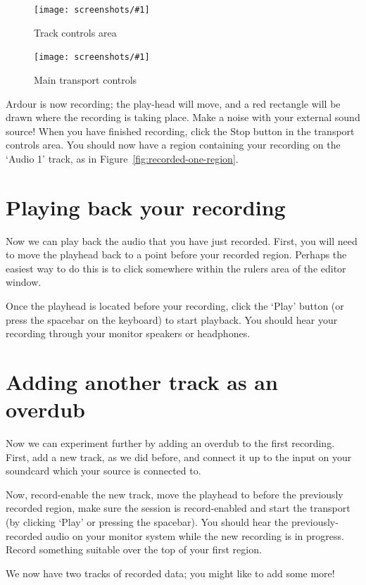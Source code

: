 \documentclass[10pt,a4paper]{book}
\newcommand{\screenshot}[3]{%
\begin{figure}[ht]%
\begin{center}
\texttt{[image: screenshots/\#1]}
\end{center}
\caption{#2}
\label{#3}
\end{figure}}
\begin{document}
\screenshot{track-controls.png}{Track controls area}{fig:track-controls}
\screenshot{transport-controls.png}{Main transport controls}{fig:transport-controls}

Ardour is now recording; the play-head will move, and a red rectangle
will be drawn where the recording is taking place.  Make a noise with
your external sound source!  When you have finished recording, click
the Stop button in the transport controls area.  You should now have a
region containing your recording on the `Audio 1' track, as in
Figure~\ref{fig:recorded-one-region}.


\section{Playing back your recording}

Now we can play back the audio that you have just recorded.  First,
you will need to move the playhead back to a point before your
recorded region.  Perhaps the easiest way to do this is to click
somewhere within the rulers area of the editor window.


Once the playhead is located before your recording, click the `Play'
button (or press the spacebar on the keyboard) to start playback.  You
should hear your recording through your monitor speakers or
headphones.

\section{Adding another track as an overdub}

Now we can experiment further by adding an overdub to the first
recording.  First, add a new track, as we did before, and connect it
up to the input on your soundcard which your source is connected to.

Now, record-enable the new track, move the playhead to before the
previously recorded region, make sure the session is record-enabled
and start the transport (by clicking `Play' or pressing the spacebar).
You should hear the previously-recorded audio on your monitor system
while the new recording is in progress.  Record something suitable
over the top of your first region.

We now have two tracks of recorded data; you might like to add some
more!
\end{document}
